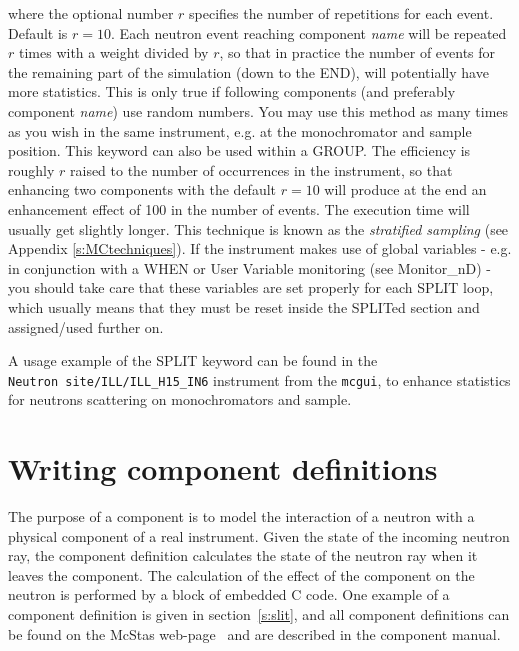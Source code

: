 where the optional number $r$ specifies the number of repetitions for each
event. Default is $r=10$.  Each neutron event reaching component \textit{name} will
be repeated $r$ times with a weight divided by $r$, so that in practice the
number of events for the remaining part of the simulation (down to the END),
will potentially have more statistics. This is only true if following components
(and preferably component \textit{name}) use random numbers. You may use this
method as many times as you wish in the same instrument, e.g. at the
monochromator and sample position. This keyword can also be used within a
GROUP. The efficiency is roughly $r$ raised to the number of occurrences in the
instrument, so that enhancing two components with the default $r=10$ will
produce at the end an enhancement effect of 100 in the number of events. The
execution time will usually get slightly longer. This technique is known as the
\emph{stratified sampling} (see Appendix \ref{s:MCtechniques}). If the
instrument makes use of global variables - e.g. in conjunction with a WHEN or
User Variable monitoring (see Monitor\_nD) - you should take care that these
variables are set properly for each SPLIT loop, which usually means that they
must be reset inside the SPLITed section and assigned/used further
on. 

A usage example of the SPLIT keyword can be found in the \\
\verb+Neutron site/ILL/ILL_H15_IN6+ instrument from the \verb+mcgui+, to enhance
statistics for neutrons scattering on monochromators and sample.

\section{Writing component definitions}
\label{s:compdefs}

The purpose of a \MCS component is to model the interaction of a
neutron with a physical component of a real instrument. Given the
state of the incoming neutron ray, the
component definition calculates the state of the neutron ray when it leaves
the component.  The calculation of the effect of the component on the
neutron is performed by a block of embedded C code.
One example of a component definition is given in section~\ref{s:slit}, and all
component definitions can be found on the McStas
web-page~\cite{mcstas_webpage} and are described in the \MCS component manual.

